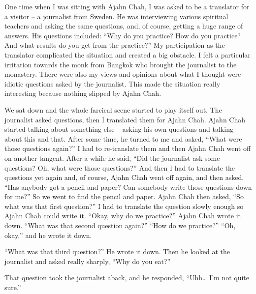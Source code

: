 \documentclass[a4paper,portrait,12pt]{article}
\begin{document}
{\small One time when I was sitting with Ajahn Chah, I } was  asked
to  be  a  translator  for  a  visitor  --  a {\small journalist
from  Sweden.  He was  interviewing } various  spiritual  teachers
and  asking  the  same questions, and, of course, getting a huge range
of answers.  His  questions  included:  ``Why  do  you practice? How
do you practice? And what results do you get from the practice?'' My
participation as the   translator   complicated   the   situation
and created a big obstacle.  I felt a particular irritation towards
the  monk  from  Bangkok  who  brought the  journalist  to  the
monastery. There  were  also my views and opinions about what I
thought were idiotic  questions  asked  by  the  journalist.  This
made   the   situation   really   interesting   because nothing
slipped by Ajahn Chah. 





We sat down and the whole farcical scene started to play itself out.
The journalist asked questions, then  I  translated  them  for  Ajahn
Chah.    Ajahn Chah  started  talking  about  something  else  --
asking  his  own  questions  and  talking  about  this and  that.
After  some  time,  he  turned  to  me  and asked, ``What  were
those  questions  again?''  I  had to  re-translate  them  and  then
Ajahn  Chah  went off on another tangent. After a while he said, ``Did
the journalist ask some questions? Oh, what were those questions?''
And then I had to translate the questions  yet  again  and,  of
course,  Ajahn  Chah went off again, and then asked, ``Has anybody got
a  pencil  and  paper?  Can  somebody  write  those questions down for
me?'' So we went to find the pencil  and  paper.  Ajahn  Chah  then
asked,  ``So what  was  that  first  question?''  I  had  to
translate the question slowly enough so Ajahn Chah could write it.
``Okay, why do we practice?'' Ajahn Chah wrote  it  down. ``What  was
that  second  question again?'' ``How do we practice?'' ``Oh, okay,''
and he wrote it down. 





 ``What  was  that  third  question?''  He  wrote  it down. Then he looked at the journalist and asked really sharply, ``Why do you eat?''  





That  question  took  the  journalist  aback,  and  he responded, ``Uhh\ldots{} I'm not quite sure.''  
\end{document}
